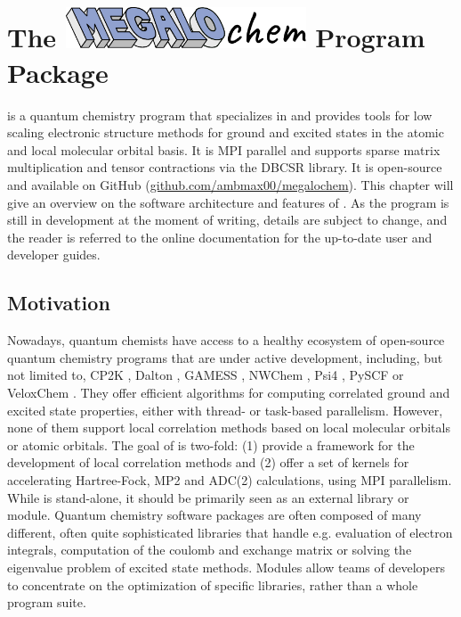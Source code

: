 \chapter[The \mchem Program Package]{The \protect\includegraphics[height=34pt]{Pics/MEGALOCHEM.pdf} Program Package}


\mchem{} is a quantum chemistry program that specializes in and provides tools for low scaling electronic structure methods for ground and excited states in the atomic and local molecular orbital basis. It is  MPI parallel and supports sparse matrix multiplication and tensor contractions via the DBCSR library. It is open-source and available on GitHub (\url{github.com/ambmax00/megalochem}). This chapter will give an overview on the software architecture and features of \mchem{}. As the program is still in development at the moment of writing, details are subject to change, and the reader is referred to the online documentation for the up-to-date user and developer guides.

\section{Motivation}

Nowadays, quantum chemists have access to a healthy ecosystem of open-source quantum chemistry programs that are under active development, including, but not limited to, CP2K \cite{Hut2014}, Dalton \cite{Aid2014}, GAMESS \cite{Gor2005}, NWChem \cite{Val2010}, Psi4 \cite{Tur2012}, PySCF \cite{Sun2018} or VeloxChem \cite{Rin2020}. They offer efficient algorithms for computing correlated ground and excited state properties, either with thread- or task-based parallelism. However, none of them support local correlation methods based on local molecular orbitals or atomic orbitals. The goal of \mchem{} is two-fold: (1) provide a framework for the development of local correlation methods and (2) offer a set of kernels for accelerating Hartree-Fock, MP2 and ADC(2) calculations, using MPI parallelism. While \mchem{} is stand-alone, it should be primarily seen as an external library or module. Quantum chemistry software packages are often composed of many different, often quite sophisticated libraries that handle e.g. evaluation of electron integrals, computation of the coulomb and exchange matrix or solving the eigenvalue problem of excited state methods. Modules allow teams of developers to concentrate on the optimization of specific libraries, rather than a whole program suite. %

